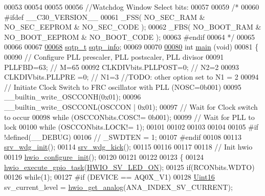 \begin{DoxyCode}
00053 
00054 
00055 
00056 \textcolor{comment}{//Watchdog Window Select bits:}
00057 
00059 \textcolor{comment}{/*}
00060 \textcolor{comment}{#ifdef \_\_C30\_VERSION\_\_}
00061 \textcolor{comment}{\_FSS( NO\_SEC\_RAM & NO\_SEC\_EEPROM & NO\_SEC\_CODE );}
00062 \textcolor{comment}{\_FBS( NO\_BOOT\_RAM & NO\_BOOT\_EEPROM & NO\_BOOT\_CODE );}
00063 \textcolor{comment}{#endif}
00064 \textcolor{comment}{*/}
00065 
00066 
00067 
\hypertarget{a00048_source_l00068}{}\hyperlink{a00048_a4e1e8b365cce7a6d497671681eb5823c}{00068} \hyperlink{a00033_d3/d95/a00779}{sqtp\_t}                  \hyperlink{a00048_a4e1e8b365cce7a6d497671681eb5823c}{sqtp\_info};
00069 
00070 
\hypertarget{a00048_source_l00080}{}\hyperlink{a00048_a840291bc02cba5474a4cb46a9b9566fe}{00080} \textcolor{keywordtype}{int} \hyperlink{a00048_a840291bc02cba5474a4cb46a9b9566fe}{main} (\textcolor{keywordtype}{void})
00081 \{
00090 \textcolor{comment}{// Configure PLL prescaler, PLL postscaler, PLL divisor}
00091 PLLFBD=63;                                           \textcolor{comment}{// M=65}
00092 CLKDIVbits.PLLPOST=0;                                \textcolor{comment}{// N2=2}
00093 CLKDIVbits.PLLPRE =0;                                \textcolor{comment}{// N1=3 //TODO: other option set to N1 = 2}
00094 \textcolor{comment}{// Initiate Clock Switch to FRC oscillator with PLL (NOSC=0b001)}
00095 \_\_builtin\_write\_OSCCONH(0x01);
00096 \_\_builtin\_write\_OSCCONL(OSCCON | 0x01);
00097 \textcolor{comment}{// Wait for Clock switch to occur}
00098 \textcolor{keywordflow}{while} (OSCCONbits.COSC!= 0b001);
00099 \textcolor{comment}{// Wait for PLL to lock}
00100 \textcolor{keywordflow}{while} (OSCCONbits.LOCK!= 1);
00101 
00102 
00103 
00104 
00105 \textcolor{preprocessor}{#if !defined(\_\_DEBUG)}
00106    \textcolor{comment}{// \_SWDTEN = 1;}
00107 \textcolor{preprocessor}{#endif}
00108 
00113     \hyperlink{a00067_a8a83a885a73db05d7faa34734d132644}{srv\_wdg\_init}();
00114     \hyperlink{a00067_a710d148845397582739d170341f3d3d9}{srv\_wdg\_kick}();
00115         
00116 
00117   
00118     \textcolor{comment}{// Init hwio}
00119     \hyperlink{a00058_a46e02bcdf3bfe45545879afb71919d47}{hwio\_configure\_init}();
00120     
00121 
00122 
00123     \{
00124     \hyperlink{a00058_a0af9eae455fbdf4e77def5bfffa109cb}{hwio\_execute\_gpio\_task}(\hyperlink{a00058_aae186cdf37c0783bf64b0aed3f1e6eda}{HWIO\_SV\_LED\_ON});
00125     \textcolor{keywordflow}{if}(RCONbits.WDTO)
00126         \textcolor{keywordflow}{while}(1);
00127 \textcolor{preprocessor}{     #if (DEVICE == AQ0X\_V1)}
00128     \hyperlink{a00072_a59a9f6be4562c327cbfb4f7e8e18f08b}{Uint16} sv\_current\_level = \hyperlink{a00058_a5770775aca185380868838e69ec20215}{hwio\_get\_analog}(ANA\_INDEX\_SV\_CURRENT);

\end{DoxyCode}
